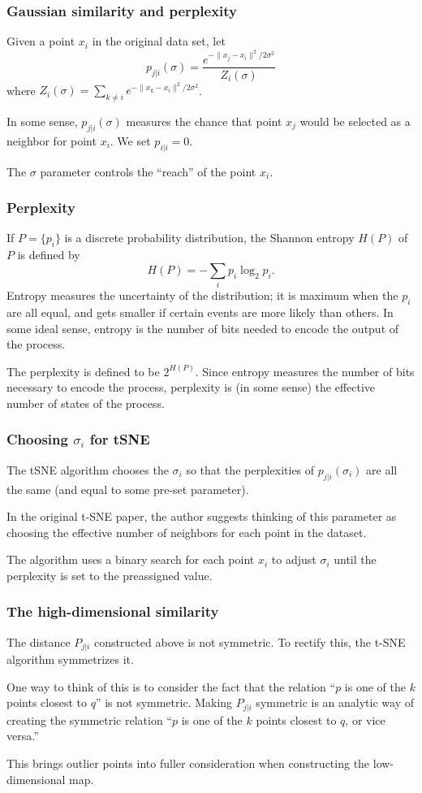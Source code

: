 \documentclass{beamer}
\begin{document}
\begin{frame}
  \frametitle{Gaussian similarity and perplexity}
  Given a point $x_i$ in the original data set, let
  $$
  p_{j|i}(\sigma)=\frac{e^{-\|x_j-x_i\|^2/2\sigma^2}}{Z_i(\sigma)}
  $$
  where $Z_i(\sigma)=\sum_{k\not=i}e^{-\|x_k-x_i\|^2/2\sigma^2}$.
  \bigskip\noindent

  In some sense, $p_{j|i}(\sigma)$ measures the chance that point $x_j$ would be selected as a neighbor for point $x_i$.  We set $p_{i|i}=0$.
  \bigskip\noindent

  The $\sigma$ parameter controls the ``reach'' of the point $x_i$.
  
\end{frame}
\begin{frame}
  \frametitle{Perplexity}
  If $P=\{p_i\}$ is a discrete probability distribution, the Shannon entropy $H(P)$ of $P$ is defined by
  $$
  H(P)=-\sum_{i} p_i\log_2 p_i.
  $$
  Entropy measures the uncertainty of the distribution; it is maximum when the $p_i$ are all equal, and gets smaller if certain events are more likely than others. In some ideal sense, entropy is the number of bits needed to encode the output of the process.
  \bigskip\noindent

  The perplexity is defined to be $2^{H(P)}$.  Since entropy measures the number of bits necessary to encode the process, perplexity is (in some sense) the
  effective number of states of the process.
\end{frame}
\begin{frame}
  \frametitle{Choosing $\sigma_i$ for tSNE}
  The tSNE algorithm chooses the $\sigma_i$ so that the perplexities of $p_{j|i}(\sigma_i)$ are all the same (and equal to some pre-set parameter).
  \bigskip\noindent

  In the original t-SNE paper, the author suggests thinking of this parameter as choosing the effective number of neighbors for each point in the
  dataset.

  The algorithm uses a binary search for each point $x_i$ to adjust $\sigma_i$ until the perplexity is set to the preassigned value.
\end{frame}
\begin{frame}
  \frametitle{The high-dimensional similarity}
  The distance $P_{j|i}$ constructed above is not symmetric.  To rectify this, the t-SNE algorithm symmetrizes it.
\bigskip\noindent

  One way to think of this is to consider the fact that the relation ``$p$ is one of the $k$ points closest to $q$'' is not symmetric.
  Making $P_{j|i}$ symmetric is an analytic way of creating the symmetric relation ``$p$ is one of the $k$ points closest to $q$, or vice versa.''
  \bigskip\noindent

  This brings outlier points into fuller consideration when constructing the low-dimensional map.
\end{frame}
\end{document}
